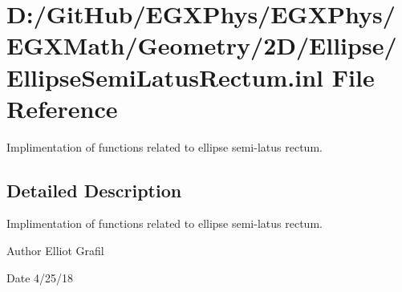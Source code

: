 \hypertarget{_ellipse_semi_latus_rectum_8inl}{}\section{D\+:/\+Git\+Hub/\+E\+G\+X\+Phys/\+E\+G\+X\+Phys/\+E\+G\+X\+Math/\+Geometry/2\+D/\+Ellipse/\+Ellipse\+Semi\+Latus\+Rectum.inl File Reference}
\label{_ellipse_semi_latus_rectum_8inl}


Implimentation of functions related to ellipse semi-\/latus rectum.  




\subsection{Detailed Description}
Implimentation of functions related to ellipse semi-\/latus rectum. 

\begin{DoxyAuthor}{Author}
Elliot Grafil 
\end{DoxyAuthor}
\begin{DoxyDate}{Date}
4/25/18 
\end{DoxyDate}
